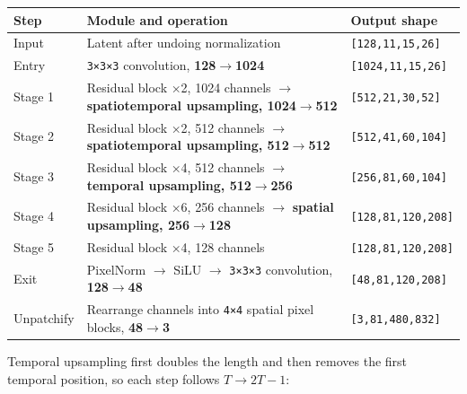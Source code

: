 \documentclass[
  11pt,
  a4paper,
]{article}
\newcounter{none} %
\begin{document}
{\def\LTcaptype{none} %
\begin{longtable}[]{@{}
  >{\raggedright\arraybackslash}p{}
  >{\raggedright\arraybackslash}p{}
  >{\raggedright\arraybackslash}p{}@{}}
\toprule\noalign{}
\begin{minipage}[b]{\linewidth}\raggedright
Step
\end{minipage} & \begin{minipage}[b]{\linewidth}\raggedright
Module and operation
\end{minipage} & \begin{minipage}[b]{\linewidth}\raggedright
Output shape
\end{minipage} \\
\midrule\noalign{}
\endhead
\bottomrule\noalign{}
\endlastfoot
Input & Latent after undoing normalization &
\texttt{{[}128,11,15,26{]}} \\
Entry & \texttt{3×3×3} convolution, \textbf{128\(\rightarrow\)1024} &
\texttt{{[}1024,11,15,26{]}} \\
Stage 1 & Residual block ×2, 1024 channels \(\rightarrow\)
\textbf{spatiotemporal upsampling, 1024\(\rightarrow\)512} &
\texttt{{[}512,21,30,52{]}} \\
Stage 2 & Residual block ×2, 512 channels \(\rightarrow\)
\textbf{spatiotemporal upsampling, 512\(\rightarrow\)512} &
\texttt{{[}512,41,60,104{]}} \\
Stage 3 & Residual block ×4, 512 channels \(\rightarrow\)
\textbf{temporal upsampling, 512\(\rightarrow\)256} &
\texttt{{[}256,81,60,104{]}} \\
Stage 4 & Residual block ×6, 256 channels \(\rightarrow\)
\textbf{spatial upsampling, 256\(\rightarrow\)128} &
\texttt{{[}128,81,120,208{]}} \\
Stage 5 & Residual block ×4, 128 channels &
\texttt{{[}128,81,120,208{]}} \\
Exit & PixelNorm \(\rightarrow\) SiLU \(\rightarrow\) \texttt{3×3×3}
convolution, \textbf{128\(\rightarrow\)48} &
\texttt{{[}48,81,120,208{]}} \\
Unpatchify & Rearrange channels into \texttt{4×4} spatial pixel blocks,
\textbf{48\(\rightarrow\)3} & \texttt{{[}3,81,480,832{]}} \\
\end{longtable}
}

\endgroup

Temporal upsampling first doubles the length and then removes the first
temporal position, so each step follows \textbf{\(T\rightarrow2T-1\)}:
\end{document}
